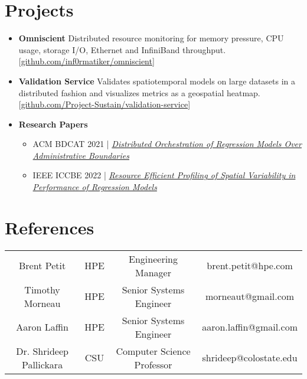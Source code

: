 \documentclass[letterpaper,11pt]{article}
\newcommand{\resumeItem}[2]{
  \item\small{
    \textbf{#1}{#2 \vspace{-2pt}}
  }
}
\newcommand{\resumeSubItem}[2]{\resumeItem{#1}{#2}\vspace{-4pt}}
\newcommand{\resumeSubHeadingListStart}{\begin{itemize}[leftmargin=*]}
\newcommand{\resumeSubHeadingListEnd}{\end{itemize}}
\newcommand{\resumeItemListStart}{\begin{itemize}}
\newcommand{\resumeItemListEnd}{\end{itemize}\vspace{-5pt}}
\begin{document}
\section{Projects}
  \resumeSubHeadingListStart
    \resumeSubItem{Omniscient }
      {Distributed resource monitoring for memory pressure, CPU usage, storage I/O, Ethernet and InfiniBand throughput. [\href{https://github.com/inf0rmatiker/omniscient}{github.com/inf0rmatiker/omniscient}]}
    \resumeSubItem{Validation Service }
      {Validates spatiotemporal models on large datasets in a distributed fashion and visualizes metrics as a geospatial heatmap. [\href{https://github.com/Project-Sustain/validation-service}{github.com/Project-Sustain/validation-service}]}
    \resumeSubItem{Research Papers }
      {}
      \resumeItemListStart
        \resumeItem{}
          {ACM BDCAT 2021 | \href{https://dl.acm.org/doi/10.1145/3492324.3494164}{\textit{Distributed Orchestration of Regression Models Over Administrative Boundaries}}}
        \resumeItem{}
          {IEEE ICCBE 2022 | \href{https://ieeexplore.ieee.org/abstract/document/10020602}{\textit{Resource Efficient Profiling of Spatial Variability in Performance of Regression Models}}}
      \resumeItemListEnd
  \resumeSubHeadingListEnd



\section{References}
  \begin{center}
  \setlength{\tabcolsep}{18pt}
  \begin{tabular}{ |c|c|c|c| }
  \hline
  Brent Petit             & HPE & Engineering Manager        & brent.petit@hpe.com \\
  Timothy Morneau         & HPE & Senior Systems Engineer    & morneaut@gmail.com \\
  Aaron Laffin            & HPE & Senior Systems Engineer    & aaron.laffin@gmail.com \\
  Dr. Shrideep Pallickara & CSU & Computer Science Professor & shrideep@colostate.edu \\
  \hline
  \end{tabular}
  \end{center}

\end{document}
